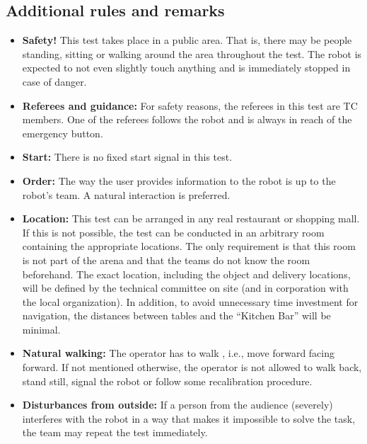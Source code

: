 \subsection{Additional rules and remarks}

\begin{itemize}
	\item \textbf{Safety!} This test takes place in a public area. That is, there may be people standing, sitting or walking around the area throughout the test. The robot is expected to not even slightly touch anything and is immediately stopped in case of danger.

	\item \textbf{Referees and guidance:} For safety reasons, the referees in this test are TC members. One of the referees follows the robot and is always in reach of the emergency button.

	\item \textbf{Start:} There is no fixed start signal in this test.

	\item \textbf{Order:} The way the user provides information to the robot is up to the robot's team. A natural interaction is preferred.

	\item \textbf{Location:} This test can be arranged in any real restaurant or shopping mall. If this is not possible, the test can be conducted in an arbitrary room containing the appropriate locations. The only requirement is that this room is not part of the arena and that the teams do not know the room beforehand. The exact location, including the object and delivery locations, will be defined by the technical committee on site (and in corporation with the local organization). In addition, to avoid unnecessary time investment for navigation, the distances between tables and the ``Kitchen Bar'' will be minimal.

	\item \textbf{Natural walking:} The operator has to walk , i.e., move forward facing forward. If not mentioned otherwise, the operator is not allowed to walk back, stand still, signal the robot or follow some recalibration procedure.

	\item \textbf{Disturbances from outside:} If a person from the audience (severely) interferes with the robot in a way that makes it impossible to solve the task, the team may repeat the test immediately.


\end{itemize}
